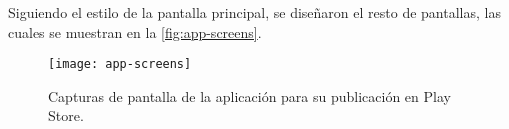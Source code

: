 Siguiendo el estilo de la pantalla principal, se diseñaron el resto de pantallas, las cuales se muestran en la \autoref{fig:app-screens}.

\newpage

\vspace*{1cm}
\begin{figure}[h!]
	\centering
	\texttt{[image: app-screens]}
	\vspace{-0.5cm}
	\caption{Capturas de pantalla de la aplicación para su publicación en Play Store.}
    \label{fig:app-screens}
\end{figure}
